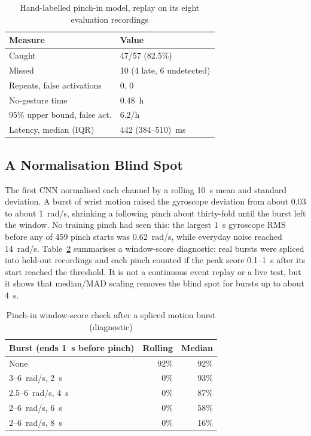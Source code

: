 \begin{table}[t]
  \centering
  \caption{Hand-labelled pinch-in model, replay on its eight evaluation recordings}
  \label{tab:hand}
  \small
  \begin{tabular}{@{}ll@{}}
    \toprule
    Measure & Value \\
    \midrule
    Caught & 47/57 (82.5\%) \\
    Missed & 10 (4 late, 6 undetected) \\
    Repeats, false activations & 0, 0 \\
    No-gesture time & 0.48~h \\
    95\% upper bound, false act. & 6.2/h \\
    Latency, median (IQR) & 442 (384--510)~ms \\
    \bottomrule
  \end{tabular}
\end{table}

\subsection{A Normalisation Blind Spot}\label{sec:blind}

The first CNN normalised each channel by a rolling 10~s mean and standard deviation. A burst of wrist motion raised the gyroscope deviation from about 0.03 to about 1~rad/s, shrinking a following pinch about thirty-fold until the burst left the window. No training pinch had seen this: the largest 1~s gyroscope RMS before any of 459 pinch starts was 0.62~rad/s, while everyday noise reached 14~rad/s. Table~\ref{tab:hangover} summarises a window-score diagnostic: real bursts were spliced into held-out recordings and each pinch counted if the peak score 0.1--1~s after its start reached the threshold. It is not a continuous event replay or a live test, but it shows that median/MAD scaling removes the blind spot for bursts up to about 4~s.

\begin{table}[t]
  \centering
  \caption{Pinch-in window-score check after a spliced motion burst (diagnostic)}
  \label{tab:hangover}
  \small
  \begin{tabular}{@{}lrr@{}}
    \toprule
    Burst (ends 1~s before pinch) & Rolling & Median \\
    \midrule
    None & 92\% & 92\% \\
    3--6~rad/s, 2~s & 0\% & 93\% \\
    2.5--6~rad/s, 4~s & 0\% & 87\% \\
    2--6~rad/s, 6~s & 0\% & 58\% \\
    2--6~rad/s, 8~s & 0\% & 16\% \\
    \bottomrule
  \end{tabular}
\end{table}

